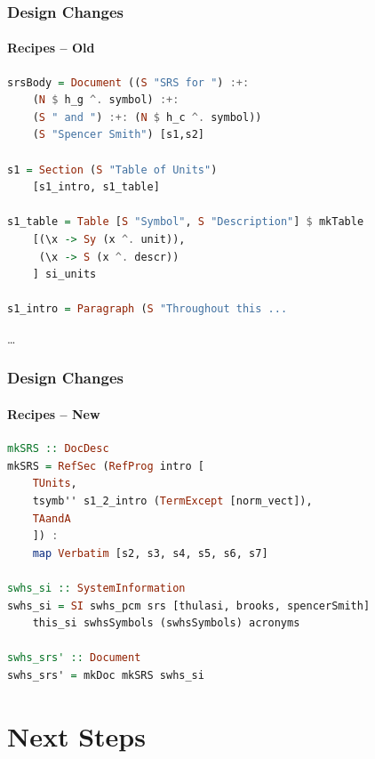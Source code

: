 \documentclass{beamer}
\begin{document}

\begin{frame}[fragile]

\frametitle{Design Changes}
\framesubtitle{Recipes -- Old}

\begin{lstlisting}[language=Haskell, frame=single, showstringspaces=false, basicstyle=\scriptsize]
srsBody = Document ((S "SRS for ") :+: 
    (N $ h_g ^. symbol) :+: 
    (S " and ") :+: (N $ h_c ^. symbol)) 
    (S "Spencer Smith") [s1,s2]

s1 = Section (S "Table of Units") 
    [s1_intro, s1_table]

s1_table = Table [S "Symbol", S "Description"] $ mkTable
    [(\x -> Sy (x ^. unit)),
     (\x -> S (x ^. descr))
    ] si_units

s1_intro = Paragraph (S "Throughout this ...
\end{lstlisting} 
\large{\ldots}

\end{frame}


\begin{frame}[fragile]

\frametitle{Design Changes}
\framesubtitle{Recipes -- New}

\begin{lstlisting}[language=Haskell, frame=single, showstringspaces=false, basicstyle=\scriptsize]
mkSRS :: DocDesc
mkSRS = RefSec (RefProg intro [
	TUnits, 
	tsymb'' s1_2_intro (TermExcept [norm_vect]),
	TAandA
	]) : 
	map Verbatim [s2, s3, s4, s5, s6, s7]

swhs_si :: SystemInformation
swhs_si = SI swhs_pcm srs [thulasi, brooks, spencerSmith] 
	this_si swhsSymbols (swhsSymbols) acronyms 

swhs_srs' :: Document
swhs_srs' = mkDoc mkSRS swhs_si
\end{lstlisting} 
\end{frame}


\section[Next Steps]{Next Steps}

\end{document}

